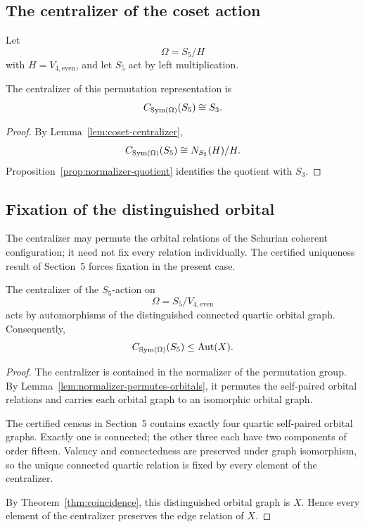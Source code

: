 \subsection{The centralizer of the coset action}


Let
\[
\Omega
=
S_5/H
\]
with \(H=V_{4,\mathrm{even}}\), and let \(S_5\) act by left
multiplication.

\begin{corollary}
\label{cor:coset-centralizer}
The centralizer of this permutation representation is
\[
C_{\operatorname{Sym}(\Omega)}(S_5)
\cong
S_3.
\]
\end{corollary}

\begin{proof}
By Lemma~\ref{lem:coset-centralizer},
\[
C_{\operatorname{Sym}(\Omega)}(S_5)
\cong
N_{S_5}(H)/H.
\]
Proposition~\ref{prop:normalizer-quotient} identifies the quotient with
\(S_3\).
\end{proof}

\subsection{Fixation of the distinguished orbital}


The centralizer may permute the orbital relations of the Schurian coherent
configuration; it need not fix every relation individually. The certified
uniqueness result of Section~5 forces fixation in the present case.

\begin{theorem}
\label{thm:centralizer-fixes-orbital}
The centralizer of the \(S_5\)-action on
\[
\Omega=S_5/V_{4,\mathrm{even}}
\]
acts by automorphisms of the distinguished connected quartic orbital
graph. Consequently,
\[
C_{\operatorname{Sym}(\Omega)}(S_5)
\leq
\operatorname{Aut}(X).
\]
\end{theorem}

\begin{proof}
The centralizer is contained in the normalizer of the permutation group.
By Lemma~\ref{lem:normalizer-permutes-orbitals}, it permutes the
self-paired orbital relations and carries each orbital graph to an
isomorphic orbital graph.

The certified census in Section~5 contains exactly four quartic
self-paired orbital graphs. Exactly one is connected; the other three each
have two components of order fifteen. Valency and connectedness are
preserved under graph isomorphism, so the unique connected quartic
relation is fixed by every element of the centralizer.

By Theorem~\ref{thm:coincidence}, this distinguished orbital graph
is \(X\). Hence every element of the centralizer preserves the edge
relation of \(X\).
\end{proof}

